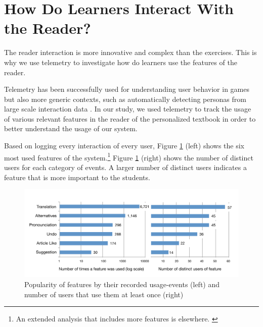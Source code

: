 





\section{How Do Learners Interact With the Reader?}
\newcommand{\feature}[1]{{\em #1}}
The reader interaction is more innovative and complex than the exercises.
This is why we use telemetry to investigate how do learners use the features of the reader. 

Telemetry has been successfully used for understanding user behavior in games \cite{Gagne11-telemetry} but also more generic contexts, such as automatically detecting personas from large scale interaction data \cite{Zhang16-telemetry}. In our study, we used telemetry to track the usage of various relevant features in the reader of the personalized textbook in order to better understand the usage of our system.

Based on logging every interaction of every user, Figure \ref{fig:feature_usage} (left) shows the six most used features of the system.\footnote{An extended analysis that includes more features is elsewhere. \cite{Chirtoaca17-apollo}} Figure \ref{fig:feature_usage} (right) shows the number of distinct users for each category of events. A larger number of distinct users indicates a feature that is more important to the students. 

  \begin{figure}[h!]
  \centering
    \includegraphics[width=1.0\columnwidth]{figures/feature-usage}
    \caption{Popularity of features by their recorded usage-events (left) and number of users that use them at least once (right)}
    \label{fig:feature_usage}
  \end{figure}

